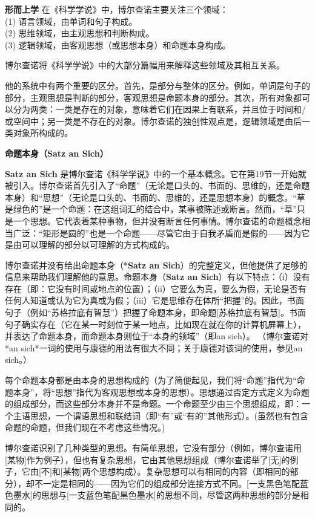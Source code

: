 \textbf{形而上学} 
在《科学学说》中，博尔查诺主要关注三个领域：\\

(1) 语言领域，由单词和句子构成。\\  
(2) 思维领域，由主观思想和判断构成。\\  
(3) 逻辑领域，由客观思想（或思想本身）和命题本身构成。

博尔查诺将《科学学说》中的大部分篇幅用来解释这些领域及其相互关系。

他的系统中有两个重要的区分。首先，是部分与整体的区分。例如，单词是句子的部分，主观思想是判断的部分，客观思想是命题本身的部分。其次，所有对象都可以分为两类：一类是存在的对象，意味着它们在因果上有联系，并且位于时间和/或空间中；另一类是不存在的对象。博尔查诺的独创性观点是，逻辑领域是由后一类对象所构成的。

\textbf{命题本身（Satz an Sich）} 

\textbf{Satz an Sich} 是博尔查诺《科学学说》中的一个基本概念。它在第19节一开始就被引入。博尔查诺首先引入了“命题”（无论是口头的、书面的、思维的，还是命题本身）和“思想”（无论是口头的、书面的、思维的，还是思想本身）的概念。“草是绿色的”是一个命题：在这组词汇的结合中，某事被陈述或断言。然而，“草”只是一个思想。它代表着某种事物，但并没有断言任何事情。博尔查诺的命题概念相当广泛：“矩形是圆的”也是一个命题——尽管它由于自我矛盾而是假的——因为它是由可以理解的部分以可理解的方式构成的。

博尔查诺并没有给出命题本身（*\textbf{Satz an Sich}）的完整定义，但他提供了足够的信息来帮助我们理解他的意思。命题本身（\textbf{Satz an Sich}）有以下特点：（i）没有存在（即：它没有时间或地点的位置）；（ii）它要么为真，要么为假，无论是否有任何人知道或认为它为真或为假；（iii）它是思维存在体所“把握”的。因此，书面句子（例如“苏格拉底有智慧”）把握了命题本身，即命题[苏格拉底有智慧]。书面句子确实存在（它在某一时刻位于某一地点，比如现在就在你的计算机屏幕上），并表达了命题本身，而命题本身则位于“本身的领域”（即an sich）。  
（博尔查诺对*an sich*一词的使用与康德的用法有很大不同；关于康德对该词的使用，参见an sich。）

每个命题本身都是由本身的思想构成的（为了简便起见，我们将“命题”指代为“命题本身”，将“思想”指代为客观思想或本身的思想）。思想通过否定方式定义为命题的组成部分，而这些部分本身并不是命题。一个命题至少由三个思想组成，即：一个主语思想，一个谓语思想和联结词（即“有”或“有的”其他形式）。(虽然也有包含命题的命题，但我们现在不考虑这些情况。)

博尔查诺识别了几种类型的思想。有简单思想，它没有部分（例如，博尔查诺用[某物]作为例子），但也有复杂思想，它由其他思想组成（博尔查诺举了[无]的例子，它由[不]和[某物]两个思想构成）。复杂思想可以有相同的内容（即相同的部分），却不一定是相同的——因为它们的组成部分连接方式不同。[一支黑色笔配蓝色墨水]的思想与[一支蓝色笔配黑色墨水]的思想不同，尽管这两种思想的部分是相同的。

